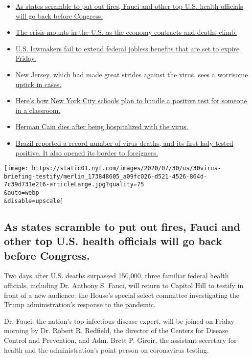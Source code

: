 \begin{itemize}
\tightlist
\item
  \protect\hyperlink{link-3d16bd29}{As states scramble to put out fires,
  Fauci and other top U.S. health officials will go back before
  Congress.}
\item
  \protect\hyperlink{link-5f1140f}{The crisis mounts in the U.S. as the
  economy contracts and deaths climb.}
\item
  \protect\hyperlink{link-59ffb834}{U.S. lawmakers fail to extend
  federal jobless benefits that are set to expire Friday.}
\item
  \protect\hyperlink{link-3cc76879}{New Jersey, which had made great
  strides against the virus, sees a worrisome uptick in cases.}
\item
  \protect\hyperlink{link-177c5cda}{Here's how New York City schools
  plan to handle a positive test for someone in a classroom.}
\item
  \protect\hyperlink{link-e01ef62}{Herman Cain dies after being
  hospitalized with the virus.}
\item
  \protect\hyperlink{link-6923e1fe}{Brazil reported a record number of
  virus deaths, and its first lady tested positive. It also opened its
  border to foreigners.}
\end{itemize}

\texttt{[image: https://static01.nyt.com/images/2020/07/30/us/30virus-briefing-testify/merlin\_173848605\_a09fc026-d521-4526-864d-7c39d731e216-articleLarge.jpg?quality=75\\\&auto=webp\\\&disable=upscale]}

\hypertarget{as-states-scramble-to-put-out-fires-fauci-and-other-top-us-health-officials-will-go-back-before-congress}{%
\subsection{As states scramble to put out fires, Fauci and other top
U.S. health officials will go back before
Congress.}\label{as-states-scramble-to-put-out-fires-fauci-and-other-top-us-health-officials-will-go-back-before-congress}}

Two days after U.S. deaths surpassed 150,000, three familiar federal
health officials, including Dr. Anthony S. Fauci, will return to Capitol
Hill to testify in front of a new audience: the House's special select
committee investigating the Trump administration's response to the
pandemic.

Dr. Fauci, the nation's top infectious disease expert, will be joined on
Friday morning by Dr. Robert R. Redfield, the director of the Centers
for Disease Control and Prevention, and Adm. Brett P. Giroir, the
assistant secretary for health and the administration's point person on
coronavirus testing.

